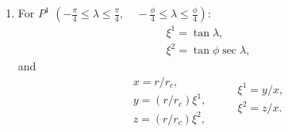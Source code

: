 \documentclass{report}
\begin{document}
\begin{enumerate}
\item For $P^1$ $\left(-\frac{\pi}{4} \leq \lambda \leq  \frac{\pi}{4}, \quad -\frac{\phi}{4} \leq \lambda \leq  \frac{\phi}{4} \right)$: 
\begin{equation}
   \begin{array}{l}
        \xi^1 = \tan \lambda,\\
        \xi^2 = \tan \phi \sec \lambda ,
   \end{array}
\end{equation}
and
\begin{equation}\label{eq:P1-cube-to-global-and-vice-versa}
    \begin{array}{l}
        x = r/r_c,  \\
        y = (r/r_c) \xi^1,\\
        z = (r/r_c) \xi^2,
    \end{array}
    \qquad 
    \begin{array}{l}
         \xi^1 = {y}/{x}, \\
         \xi^2 = {z}/{x} .\\
    \end{array}
\end{equation}


\end{enumerate}
\end{document}
